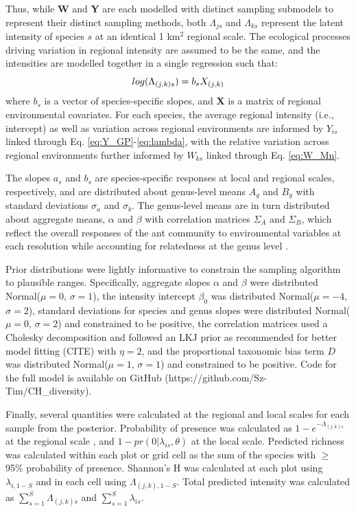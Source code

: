 \documentclass[preprint,review,times,12pt]{elsarticle}
\begin{document}
Thus, while \textbf{W} and \textbf{Y} are each modelled with distinct sampling submodels to represent their distinct sampling methods, both $\Lambda_{js}$ and $\Lambda_{ks}$ represent the latent intensity of species $s$ at an identical 1 km$^2$ regional scale. The ecological processes driving variation in regional intensity are assumed to be the same, and the intensities are modelled together in a single regression such that:
    \begin{equation}
        log(\Lambda_{(j,k)s}) = b_s X_{(j,k)} \\
        \label{eq:LAMBDA}
    \end{equation}
where $b_s$ is a vector of species-specific slopes, and \textbf{X} is a matrix of regional environmental covariates. For each species, the average regional intensity (i.e., intercept) as well as variation across regional environments are informed by $Y_{is}$ linked through Eq. \ref{eq:Y_GP}-\ref{eq:lambda}, with the relative variation across regional environments further informed by $W_{ks}$ linked through Eq. \ref{eq:W_Mn}.  

The slopes $a_s$ and $b_s$ are species-specific responses at local and regional scales, respectively, and are distributed about genus-level means $A_g$ and $B_g$ with standard deviations $\sigma_a$ and $\sigma_b$. The genus-level means are in turn distributed about aggregate means, $\alpha$ and $\beta$ with correlation matrices $\Sigma_A$ and $\Sigma_B$, which reflect the overall responses of the ant community to environmental variables at each resolution while accounting for relatedness at the genus level \citep{Hadfield2010b,Szewczyk2018}.

Prior distributions were lightly informative to constrain the sampling algorithm to plausible ranges. Specifically, aggregate slopes $\alpha$ and $\beta$ were distributed Normal($\mu=0$, $\sigma=1$), the intensity intercept $\beta_0$ was distributed Normal($\mu=-4$, $\sigma=2$), standard deviations for species and genus slopes were distributed Normal($\mu=0$, $\sigma=2$) and constrained to be positive, the correlation matrices used a Cholesky decomposition and followed an LKJ prior as recommended for better model fitting (CITE) with $\eta=2$, and the proportional taxonomic bias term $D$ was distributed Normal($\mu=1$, $\sigma=1$) and constrained to be positive. Code for the full model is available on GitHub (https://github.com/Sz-Tim/CH\_diversity).

Finally, several quantities were calculated at the regional and local scales for each sample from the posterior. Probability of presence was calculated as $1 - e^{-\Lambda_{(j,k)s}}$ at the regional scale  \citep{Hefley2016}, and $1 - pr(0 | \lambda_{is}, \theta)$ at the local scale. Predicted richness was calculated within each plot or grid cell as the sum of the species with $\geq$ 95\% probability of presence. Shannon's H was calculated at each plot using $\lambda_{i,1-S}$ and in each cell using $\Lambda_{(j,k),1-S}$. Total predicted intensity was calculated as $\sum_{s=1}^{S}\Lambda_{(j,k)s}$ and $\sum_{s=1}^{S}\lambda_{is}$. 
\end{document}
